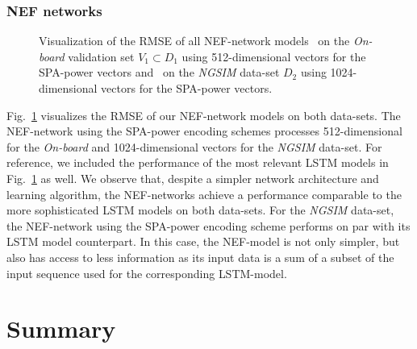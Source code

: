 \subsubsection{\ac{NEF} networks}
\begin{figure}[t!]
	\centering
    \vspace{-0.3cm}
    \caption{Visualization of the \ac{RMSE} of all \ac{NEF}-network models~\protect{} on the \emph{On-board} validation set $V_1 \subset D_1$ using \num{512}-dimensional vectors for the \ac{SPA}-power vectors and~\protect{} on the \emph{\ac{NGSIM}} data-set $D_2$ using \num{1024}-dimensional vectors for the \ac{SPA}-power vectors.}\label{fig:rmse_nef_nets}

\end{figure}

Fig.~\ref{fig:rmse_nef_nets} visualizes the \ac{RMSE} of our \ac{NEF}-network models on both data-sets.
The \ac{NEF}-network using the \ac{SPA}-power encoding schemes processes \num{512}-dimensional  for the \emph{On-board} and \num{1024}-dimensional vectors for the \emph{\ac{NGSIM}} data-set.
For reference, we included the performance of the most relevant \ac{LSTM} models in Fig.~\ref{fig:rmse_nef_nets} as well.
We observe that, despite a simpler network architecture and learning algorithm, the \ac{NEF}-networks achieve a performance comparable to the more sophisticated \ac{LSTM} models on both data-sets.
For the \emph{\ac{NGSIM}} data-set, the \ac{NEF}-network using the \ac{SPA}-power encoding scheme performs on par with its \ac{LSTM} model counterpart.
In this case, the \ac{NEF}-model is not only simpler, but also has access to less information as its input data is a sum of a subset of the input sequence used for the corresponding \ac{LSTM}-model.

\section{Summary}

